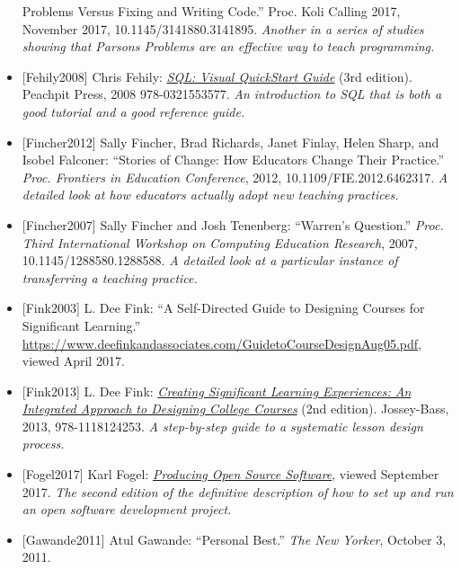 \documentclass[10pt,statementpaper]{memoir}
\begin{document}
\begin{itemize}
{  Problems Versus Fixing and Writing Code.'' Proc. Koli Calling 2017,
  November 2017, 10.1145/3141880.3141895. \emph{Another in a series of
  studies showing that Parsons Problems are an effective way to teach
  programming.}}
\item
  \protect\hypertarget{fehily-sql}{}{{[}Fehily2008{]}} Chris Fehily:
  \emph{\href{https://www.amazon.com/SQL-Visual-QuickStart-Guide-3rd/dp/0321553578/}{SQL:
  Visual QuickStart Guide}} (3rd edition). Peachpit Press, 2008
  978-0321553577. \emph{An introduction to SQL that is both a good
  tutorial and a good reference guide.}
\item
  \protect\hypertarget{fincher-stories-change}{}{{[}Fincher2012{]}}
  Sally Fincher, Brad Richards, Janet Finlay, Helen Sharp, and Isobel
  Falconer: ``Stories of Change: How Educators Change Their Practice.''
  \emph{Proc. Frontiers in Education Conference}, 2012,
  10.1109/FIE.2012.6462317. \emph{A detailed look at how educators
  actually adopt new teaching practices.}
\item
  \protect\hypertarget{fincher-warrens-questions}{}{{[}Fincher2007{]}}
  Sally Fincher and Josh Tenenberg: ``Warren's Question.'' \emph{Proc.
  Third International Workshop on Computing Education Research}, 2007,
  10.1145/1288580.1288588. \emph{A detailed look at a particular
  instance of transferring a teaching practice.}
\item
  \protect\hypertarget{fink-short}{}{{[}Fink2003{]}} L. Dee Fink: ``A
  Self-Directed Guide to Designing Courses for Significant Learning.''
  \url{https://www.deefinkandassociates.com/GuidetoCourseDesignAug05.pdf},
  viewed April 2017.
\item
  \protect\hypertarget{fink-significant}{}{{[}Fink2013{]}} L. Dee Fink:
  \emph{\href{https://www.amazon.com/Creating-Significant-Learning-Experiences-Integrated/dp/1118124251/}{Creating
  Significant Learning Experiences: An Integrated Approach to Designing
  College Courses}} (2nd edition). Jossey-Bass, 2013, 978-1118124253.
  \emph{A step-by-step guide to a systematic lesson design process.}
\item
  \protect\hypertarget{fogel-poss}{}{{[}Fogel2017{]}} {Karl Fogel:
  \emph{\href{http://producingoss.com/}{Producing Open Source
  Software}}, viewed September 2017. \emph{The second edition of the
  definitive description of how to set up and run an open software
  development project.}}
\item
  \protect\hypertarget{gawande-personal-best}{}{{[}Gawande2011{]}} Atul
  Gawande: ``Personal Best.'' \emph{The New Yorker}, October 3, 2011.

\end{itemize}
\end{document}
